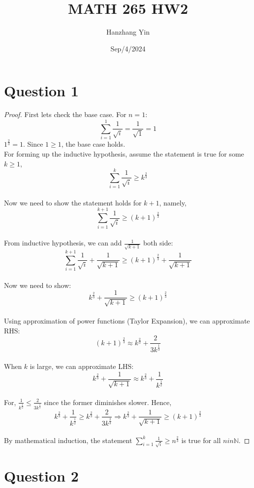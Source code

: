 \documentclass{article}
\title{MATH 265 HW2}
\author{Hanzhang Yin}
\date{Sep/4/2024}
\begin{document}
\maketitle

\section*{Question 1}
\begin{proof}
    First lets check the base case. For $n = 1$: 
    \[ \sum_{i=1}^{1} \frac{1}{\sqrt{i}} = \frac{1}{\sqrt{1}} = 1 \]
    $1^{\frac{2}{3}} = 1$. Since $1 \geq 1$, the base case holds.
    \\
    For forming up the inductive hypothesis, assume the statement is true for some $k \geq 1$, 
    \[ \sum_{i=1}^{k} \frac{1}{\sqrt{i}} \geq k^{\frac{2}{3}}  \]
    \\
    Now we need to show the statement holds for $k + 1$, namely, 
    \[ \sum_{i=1}^{k+1} \frac{1}{\sqrt{i}} \geq (k + 1)^{\frac{2}{3}} \]
    \\
    From inductive hypothesis, we can add $\frac{1}{\sqrt{k+1}}$ both side:
    \[ \sum_{i=1}^{k+1} \frac{1}{\sqrt{i}} + \frac{1}{\sqrt{k + 1}} \geq (k + 1)^{\frac{2}{3}} + \frac{1}{\sqrt{k + 1}} \]
    \\
    Now we need to show:
    \[ k^{\frac{2}{3}} + \frac{1}{\sqrt{k + 1}} \geq (k + 1)^{\frac{2}{3}} \]
    \\
    Using approximation of power functions (Taylor Expansion), we can approximate RHS: 
    \[ (k + 1)^{\frac{2}{3}} \approx k^{\frac{2}{3}} + \frac{2}{3k^{\frac{1}{3}}} \]
    \\
    When $k$ is large, we can approximate LHS:
    \[ k^{\frac{2}{3}} + \frac{1}{\sqrt{k + 1}} \approx k^{\frac{2}{3}} + \frac{1}{k^{\frac{1}{2}}} \]
    \\
    For, \( \frac{1}{k^{\frac{1}{2}}} \leq \frac{2}{3k^{\frac{1}{3}}} \) since the former diminishes slower. Hence,
    \[ k^{\frac{2}{3}} + \frac{1}{k^{\frac{1}{2}}} \geq k^{\frac{2}{3}} + \frac{2}{3 k^{\frac{2}{3}}} \Rightarrow k^{\frac{2}{3}} + \frac{1}{\sqrt{k + 1}} \geq (k + 1)^{\frac{2}{3}} \]
    \\
    By mathematical induction, the statement \( \sum_{i=1}^{k} \frac{1}{\sqrt{i}} \geq n^{\frac{2}{3}} \) is true for all $n 
    in \mathbb{N}$.
\end{proof}

\section*{Question 2}
\end{document}
